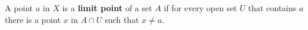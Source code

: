 A point $a$ in $X$ is a \textbf{limit point} of a set $A$ if for every open set $U$ that contains $a$ there is a point $x$ in $A \cap U$ such that $x \neq a$.
